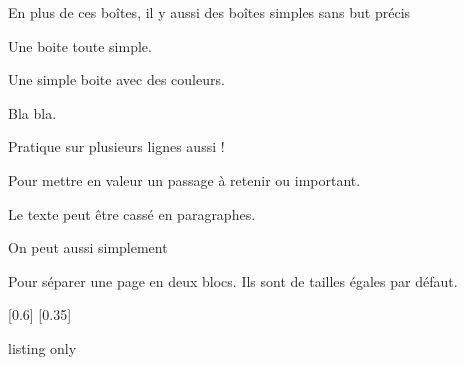 En plus de ces boîtes, il y aussi des boîtes simples sans but précis
\begin{boiteCodeTex}{}
  \begin{boite}
    Une boite toute simple.
  \end{boite}

  \begin{boiteColoree}
  \end{boiteColoree}
  
  \begin{boiteColoree}[yellow-150]
    Une simple boite avec des couleurs.
  \end{boiteColoree}

  \begin{boiteColoree}[magenta-200]
    Bla bla.

    Pratique sur plusieurs lignes aussi !
  \end{boiteColoree}

  \begin{importants}
    Pour mettre en valeur un passage à retenir ou important.

    Le texte peut être cassé en paragraphes.
  \end{importants}

  On peut aussi simplement 
\end{boiteCodeTex}


\begin{boiteCodeTex}{}
  \separationBlocs
    { Pour séparer une page en deux blocs. }
    { Ils sont de tailles égales par défaut. }

  \separationBlocs
    { \lipsum[1-2] }[0.6]
    { \lipsum[1] }[0.35]

\end{boiteCodeTex}

\begin{boiteCodeTex}{}
  \centering
  
\end{boiteCodeTex}

\begin{boiteCodeTex}{}

  \lipsum[1]
\end{boiteCodeTex}

\begin{boiteCodeTex}{listing only}
\end{boiteCodeTex}
